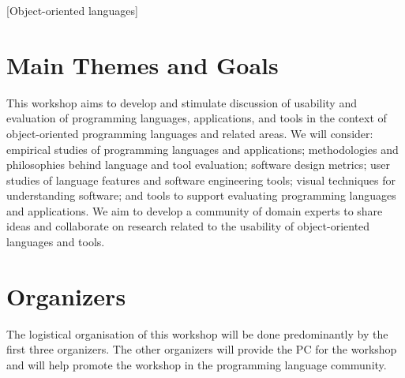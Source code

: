 \documentclass{acm_proc_article-sp}
\begin{document}
[Object-oriented languages]



\section{Main Themes and Goals}

This workshop aims to develop and stimulate discussion of usability and evaluation of programming languages, applications,  and tools in the context of object-oriented programming languages and related areas. 
We will consider: empirical studies of programming languages and applications; methodologies and philosophies behind language and tool evaluation; software design metrics; user studies of language features and software engineering tools; visual techniques for understanding software; and tools to support evaluating programming languages and applications. 
We aim to develop a community of domain experts to share ideas and collaborate on research related to the usability of object-oriented languages and tools. 

\section{Organizers}

The logistical organisation of this workshop will be done predominantly by the first three organizers.
The other organizers will provide the PC for the workshop and will help 
promote the workshop in the programming language community. 
\end{document}
